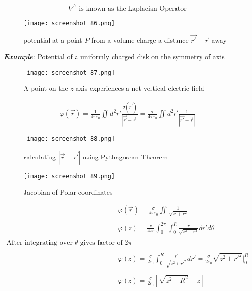 \documentclass[svgnames]{article}   	%
\begin{document}
\[
  \nabla^2 \text{ is known as the Laplacian Operator}
\] \vspace{10px} 

\begin{figure}[H]
  \centering
    \texttt{[image: screenshot 86.png]}
    \caption{potential at a point $P$ from a volume charge a distance  $\vec{r'}
    - \vec{r}$ away}
\end{figure}


\textbf{ \textit{Example}}: Potential of a uniformly charged disk on the
symmetry of axis 


\begin{figure}[H]
  \centering
    \texttt{[image: screenshot 87.png]}
    \caption{A point on the $z$ axis experiences a net vertical electric field}
\end{figure}



\begin{align*}
  \varphi(\vec{r}) = \frac{1}{4\pi\varepsilon_0} \iint d^2 r'
  \frac{\sigma(\vec{r'})}{|\vec{r'} - \vec{r}|}
= \frac{\sigma}{4\pi\varepsilon_0} \iint d^2 r' \frac{1}{|\vec{r'} - \vec{r}|} 
\end{align*}

\begin{figure}[H]
  \centering
    \texttt{[image: screenshot 88.png]}
    \caption{calculating $|\vec{r} - \vec{r'}|$ using Pythagorean Theorem}
\end{figure}




\begin{figure}[H]
  \centering
    \texttt{[image: screenshot 89.png]}
    \caption{Jacobian of Polar coordinates}
\end{figure}



\begin{align*}
  &\varphi(\vec{r}) = \frac{\sigma}{4\pi\varepsilon_0} \iint \frac{1}{ \sqrt{z^2
  + r^2}} \\\\
  &\varphi(z) = \frac{\sigma}{4\pi\varepsilon} \int_0^{2\pi} \int_0^R \frac{r}{ \sqrt{z^2 + r^2}}
  dr' d\theta \\\\
  \text{After integrating over $\theta$ gives factor of $2\pi$ }\\\\
  &\varphi(z) = \frac{\sigma}{2\varepsilon_0} \int_0^R \frac{r'}{ \sqrt{z^2
  + r'^2}} dr' = \frac{\sigma}{2\varepsilon_0} \sqrt{z^2 + r'^2} \Big|_0^R \\\\
  &\varphi(z) = \frac{\sigma}{2\varepsilon_0} [\sqrt{z^2 + R^2} - z]
\end{align*}
\end{document}

